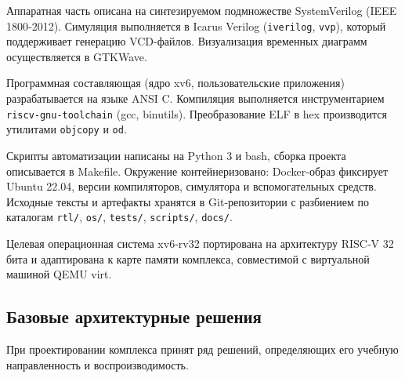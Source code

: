 Аппаратная часть описана на синтезируемом подмножестве SystemVerilog (IEEE 1800‑2012). Симуляция выполняется в Icarus Verilog (\texttt{iverilog}, \texttt{vvp}), который поддерживает генерацию VCD-файлов. Визуализация временных диаграмм осуществляется в GTKWave.

Программная составляющая (ядро xv6, пользовательские приложения) разрабатывается на языке ANSI C. Компиляция выполняется инструментарием \texttt{riscv-gnu-toolchain} (gcc, binutils). Преобразование ELF в hex производится утилитами \texttt{objcopy} и \texttt{od}.

Скрипты автоматизации написаны на Python 3 и bash, сборка проекта описывается в Makefile. Окружение контейнеризовано: Docker-образ фиксирует Ubuntu 22.04, версии компиляторов, симулятора и вспомогательных средств. Исходные тексты и артефакты хранятся в Git-репозитории с разбиением по каталогам \texttt{rtl/}, \texttt{os/}, \texttt{tests/}, \texttt{scripts/}, \texttt{docs/}.

Целевая операционная система xv6‑rv32 портирована на архитектуру RISC‑V 32 бита и адаптирована к карте памяти комплекса, совместимой с виртуальной машиной QEMU virt.

\subsection{Базовые архитектурные решения}

При проектировании комплекса принят ряд решений, определяющих его учебную направленность и воспроизводимость.

